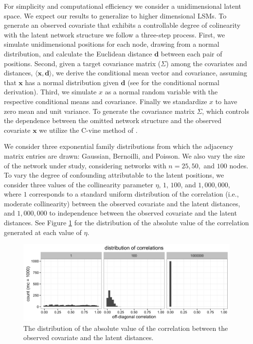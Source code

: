 \documentclass[11pt]{article}
\begin{document}
For simplicity and computational efficiency we consider a unidimensional latent space. We expect our results to generalize to higher dimensional LSMs. To generate an observed covariate that exhibits a controllable degree of colinearity with the latent network structure we follow a three-step process. First, we simulate unidimensional positions for each node, drawing from a normal distribution, and calculate the Euclidean distance $\mathbf{d}$ between each pair of positions. Second, given a target covariance matrix ($\Sigma$) among the covariates and distances, $\langle \mathbf{x}, \mathbf{d} \rangle$, we derive the conditional mean vector and covariance, assuming that $\mathbf{x}$ has a normal distribution given $\mathbf{d}$ (see \cite[pp. 116--117]{eaton1983} for the conditional normal derivation). Third, we simulate $x$ as a normal random variable with the respective conditional means and covariance. Finally we standardize $x$ to have zero mean and unit variance. To generate the covariance matrix $\Sigma$, which controls the dependence between the omitted network structure and the observed covariate $\mathbf{x}$ we utilize the C-vine method of \cite{lewandowski2009generating}. %

We consider three exponential family distributions from which the adjacency matrix entries are drawn: Gaussian, Bernoilli, and Poisson. We also vary the size of the network under study, considering networks with $n = 25, 50,$ and $100$ nodes. To vary the degree of confounding attributable to the latent positions, we consider three values of the collinearity parameter $\eta$, $1$, $100$, and $1,000,000$, where $1$ corresponds to a standard uniform distribution of the correlation  (i.e.,  moderate collinearity) between the observed covariate and the latent distances, and $1,000,000$ to independence between the observed covariate and the latent distances. See Figure \ref{fig:vine} for the distribution of the absolute value of the correlation generated at each value of $\eta$.

\begin{figure}
\includegraphics[width=\textwidth]{figures/max_r_vine.png}
\caption{The distribution of the absolute value of the correlation between the observed covariate and the latent distances. \label{fig:vine}}
\end{figure}
\end{document}

